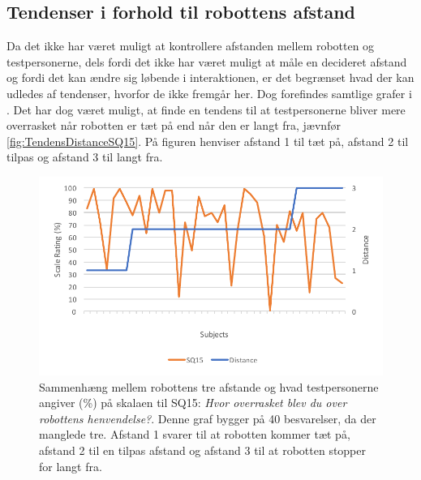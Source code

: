 \subsection{Tendenser i forhold til robottens afstand}
\label{DatabehandlingAfstandTendenser}
%
Da det ikke har været muligt at kontrollere afstanden mellem robotten og testpersonerne, dels fordi det ikke har været muligt at måle en decideret afstand og fordi det kan ændre sig løbende i interaktionen, er det begrænset hvad der kan udledes af tendenser, hvorfor de ikke fremgår her. Dog forefindes samtlige grafer i . Det har dog været muligt, at finde en tendens til at testpersonerne bliver mere overrasket når robotten er tæt på end når den er langt fra, jævnfør \autoref{fig:TendensDistanceSQ15}. På figuren henviser afstand 1 til tæt på, afstand 2 til tilpas og afstand 3 til langt fra. 
%
\begin{figure}[H]
\centering
\includegraphics[width=\textwidth]{Figure/DatabehandlingSkalaer/TendensHeight/DistanceSQ15}
\caption{Sammenhæng mellem robottens tre afstande og hvad testpersonerne angiver (\%) på skalaen til SQ15: \textit{Hvor overrasket blev du over robottens henvendelse?}. Denne graf bygger på 40 besvarelser, da der manglede tre. Afstand 1 svarer til at robotten kommer tæt på, afstand 2 til en tilpas afstand og afstand 3 til at robotten stopper for langt fra.}
\label{fig:TendensDistanceSQ15}
\end{figure}
\noindent
%
